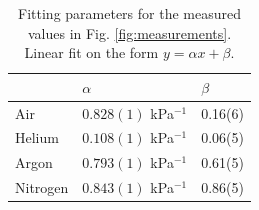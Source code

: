 \begin{table}
  \centering
  \caption{Fitting parameters for the measured values in Fig. \ref{fig:measurements}. Linear fit on the form $y=\alpha x + \beta$.}
  \label{tab:linearFits}
  \begin{tabular}{l|l|l}
        & $\alpha$ & $\beta$ \\ \hline
  Air   & $0.828(1)$ kPa$^{-1}$ & 0.16(6) \\
  Helium & $0.108(1)$ kPa$^{-1}$ & 0.06(5) \\
  Argon  & $0.793(1)$ kPa$^{-1}$ & 0.61(5) \\
  Nitrogen & $0.843(1)$ kPa$^{-1}$ & 0.86(5)
  \end{tabular}
\end{table}

